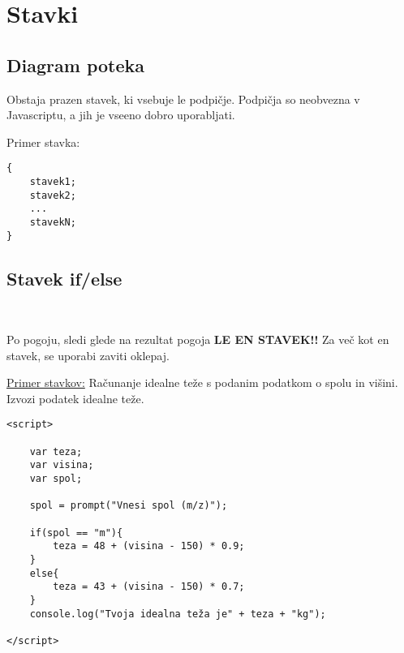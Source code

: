 \section{Stavki}

\subsection*{Diagram poteka}


Obstaja prazen stavek, ki vsebuje le podpičje. Podpičja so neobvezna v Javascriptu, a jih je vseeno dobro uporabljati.\

Primer stavka:
\begin{verbatim}
{
	stavek1;
	stavek2;
	...
	stavekN;	
}
\end{verbatim}



\subsection{Stavek if/else}\

{\centering{}\par}

Po pogoju, sledi glede na rezultat pogoja \textbf{LE EN STAVEK!!} Za več kot en stavek, se uporabi zaviti oklepaj.\

{\centering{}\par}

\underline{Primer stavkov:}
Računanje idealne teže s podanim podatkom o spolu in višini. Izvozi podatek idealne teže.
\begin{verbatim}
<script>

    var teza;
    var visina;
    var spol;

    spol = prompt("Vnesi spol (m/z)");

    if(spol == "m"){
        teza = 48 + (visina - 150) * 0.9;
    }
    else{
        teza = 43 + (visina - 150) * 0.7;    
    }
    console.log("Tvoja idealna teža je" + teza + "kg");
    
</script>
\end{verbatim}



